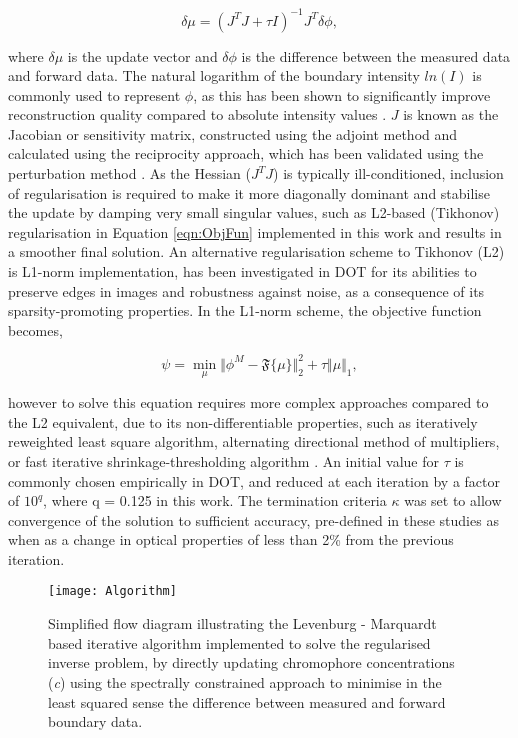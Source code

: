 \documentclass[twoside]{bhamthesis}
\theoremstyle{definition}
\begin{document}
\begin{equation} 
\delta \mu = (J^T J +\tau I)^{-1}J^T \delta \phi, 
  \label{eqn:Moore-penrose}
\end{equation}

where $\delta \mu$ is the update vector and $\delta \phi$ is the difference between the measured data and forward data. The natural logarithm of the boundary intensity $ln(I)$ is commonly used to represent $\phi$, as this has been shown to significantly improve reconstruction quality compared to absolute intensity values \cite{arridge1999optical}.  $J$ is known as the Jacobian or sensitivity matrix, constructed using the adjoint method and calculated using the reciprocity approach, which has been validated using the perturbation method \cite{arridge1995photon}. As the Hessian ($J^T J$) is typically ill-conditioned, inclusion of regularisation is required to make it more diagonally dominant and stabilise the update by damping very small singular values, such as L2-based (Tikhonov) regularisation \cite{tikhonov2013numerical} in Equation \ref{eqn:ObjFun} implemented in this work and results in a smoother final solution. An alternative regularisation scheme to Tikhonov (L2) is L1-norm implementation,  has been investigated in DOT for its abilities to preserve edges in images and robustness against noise, as a consequence of its sparsity-promoting properties. In the L1-norm scheme, the objective function becomes,

\begin{equation} 
 \psi = \min_{\mu} \Vert \phi^M - \mathfrak{F} \lbrace \mu \rbrace \Vert^2_2 + \tau \Vert \mu \Vert_1,
  \label{eqn:RTE}
\end{equation}

however to solve this equation requires more complex approaches compared to the L2 equivalent, due to its non-differentiable properties, such as iteratively reweighted least square algorithm, alternating directional method of multipliers, or fast iterative shrinkage-thresholding algorithm \cite{lu20181}.  An initial value for $\tau$ is commonly chosen empirically in DOT, and reduced at each iteration by a factor of $10^{q}$, where q = 0.125 in this work. The termination criteria $\kappa$ was set to allow convergence of the solution to sufficient accuracy, pre-defined in these studies as when as a change in optical properties of less than 2\% from the previous iteration.

\begin{figure}[!ht]
  \centering
  \texttt{[image: Algorithm]}
\caption{Simplified flow diagram illustrating the Levenburg - Marquardt based iterative algorithm implemented to solve the regularised inverse problem, by directly updating chromophore concentrations (\textit{c}) using the spectrally constrained approach to minimise in the least squared sense the difference between measured and forward boundary data.}
\label{fig:Inverse_algorithm}
\end{figure}
\end{document}
